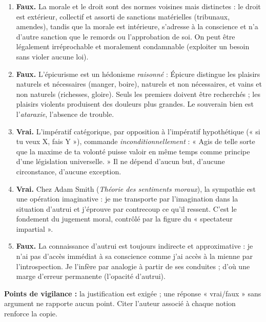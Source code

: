\documentclass[11pt]{article}
\newcommand{\cle}[1]{{\popxbold\color{popdark}#1}}
\begin{document}
\begin{corrige}
\begin{enumerate}
\item \textbf{Faux.} La morale et le droit sont des normes voisines mais distinctes : le droit est extérieur, collectif et assorti de sanctions matérielles (tribunaux, amendes), tandis que la morale est intérieure, s'adresse à la conscience et n'a d'autre sanction que le remords ou l'approbation de soi. On peut être légalement irréprochable et moralement condamnable (exploiter un besoin sans violer aucune loi).
\item \textbf{Faux.} L'épicurisme est un hédonisme \emph{raisonné} : Épicure distingue les plaisirs naturels et nécessaires (manger, boire), naturels et non nécessaires, et vains et non naturels (richesses, gloire). Seuls les premiers doivent être recherchés ; les plaisirs violents produisent des douleurs plus grandes. Le souverain bien est l'\emph{ataraxie}, l'absence de trouble.
\item \textbf{Vrai.} L'impératif catégorique, par opposition à l'impératif hypothétique (« si tu veux X, fais Y »), commande \emph{inconditionnellement} : « Agis de telle sorte que la maxime de ta volonté puisse valoir en même temps comme principe d'une législation universelle. » Il ne dépend d'aucun but, d'aucune circonstance, d'aucune exception.
\item \textbf{Vrai.} Chez Adam Smith (\emph{Théorie des sentiments moraux}), la \cle{sympathie} est une opération imaginative : je me transporte par l'imagination dans la situation d'autrui et j'éprouve par contrecoup ce qu'il ressent. C'est le fondement du jugement moral, contrôlé par la figure du « spectateur impartial ».
\item \textbf{Faux.} La connaissance d'autrui est toujours indirecte et approximative : je n'ai pas d'accès immédiat à sa conscience comme j'ai accès à la mienne par l'introspection. Je l'infère par analogie à partir de ses conduites ; d'où une marge d'erreur permanente (l'opacité d'autrui).
\end{enumerate}
\textbf{Points de vigilance :} la justification est exigée ; une réponse « vrai/faux » sans argument ne rapporte aucun point. Citer l'auteur associé à chaque notion renforce la copie.
\end{corrige}
\end{document}
